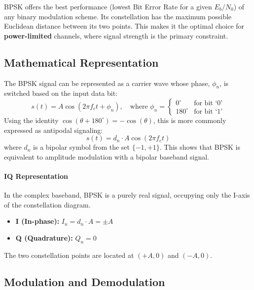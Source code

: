 \begin{keyconcept}
    BPSK offers the best performance (lowest Bit Error Rate for a given $E_b/N_0$) of any binary modulation scheme. Its constellation has the maximum possible Euclidean distance between its two points. This makes it the optimal choice for \textbf{power-limited} channels, where signal strength is the primary constraint.
\end{keyconcept}


\subsection{Mathematical Representation}

The BPSK signal can be represented as a carrier wave whose phase, $\phi_n$, is switched based on the input data bit:
\begin{equation}
    s(t) = A \cos(2\pi f_c t + \phi_n), \quad \text{where } \phi_n = \begin{cases} 0^\circ & \text{for bit `0'} \\ 180^\circ & \text{for bit `1'} \end{cases}
\end{equation}
Using the identity $\cos(\theta + 180^\circ) = -\cos(\theta)$, this is more commonly expressed as antipodal signaling:
\begin{equation}
    s(t) = d_n \cdot A \cos(2\pi f_c t)
\end{equation}
where $d_n$ is a bipolar symbol from the set $\{-1, +1\}$. This shows that BPSK is equivalent to amplitude modulation with a bipolar baseband signal.

\paragraph{IQ Representation}
In the complex baseband, BPSK is a purely real signal, occupying only the I-axis of the constellation diagram.
\begin{itemize}
    \item \textbf{I (In-phase):} $I_n = d_n \cdot A = \pm A$
    \item \textbf{Q (Quadrature):} $Q_n = 0$
\end{itemize}
The two constellation points are located at $(+A, 0)$ and $(-A, 0)$.


\subsection{Modulation and Demodulation}

